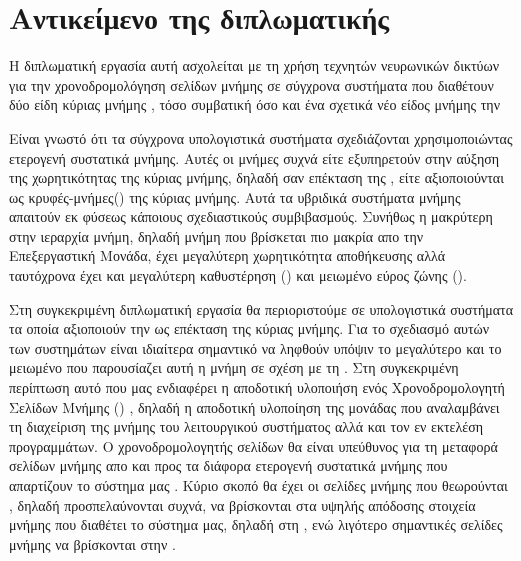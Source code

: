 \begin{comment}
Χρησιμοποιώντας λοιπόν τις τεχνολογίες του Σημασιολογικού Ιστού
μπορούμε να δημιουργήσουμε συστήματα ομότιμων κόμβων με αυξημένη
διαλειτουργικότητα τα οποία θα ανταλλάσσουν μεταξύ τους πληροφορία
με νόημα και θα έχουν τη δυνατότητα διατύπωσης ερωτήσεων πιο
εκφραστικών από αυτές που βασίζονται σε λέξεις κλειδιά.
\end{comment}

\section{Αντικείμενο της διπλωματικής}
Η διπλωματική εργασία αυτή ασχολείται με τη χρήση τεχνητών νευρωνικών δικτύων για την χρονοδρομολόγηση σελίδων μνήμης σε σύγχρονα συστήματα που διαθέτουν δύο είδη κύριας μνήμης , τόσο συμβατική  όσο και ένα σχετικά νέο είδος μνήμης την 

Είναι γνωστό ότι τα σύγχρονα υπολογιστικά συστήματα σχεδιάζονται χρησιμοποιώντας ετερογενή συστατικά μνήμης. Αυτές οι μνήμες συχνά  είτε εξυπηρετούν στην αύξηση της χωρητικότητας της κύριας μνήμης, δηλαδή σαν επέκταση της , είτε αξιοποιούνται ως κρυφές-μνήμες() της κύριας μνήμης. Αυτά τα υβριδικά συστήματα μνήμης απαιτούν εκ φύσεως κάποιους σχεδιαστικούς συμβιβασμούς. Συνήθως η μακρύτερη στην ιεραρχία μνήμη, δηλαδή μνήμη που βρίσκεται πιο μακρία απο την Επεξεργαστική Μονάδα, έχει μεγαλύτερη χωρητικότητα αποθήκευσης αλλά ταυτόχρονα έχει και μεγαλύτερη καθυστέρηση () και μειωμένο εύρος ζώνης ().

Στη συγκεκριμένη διπλωματική εργασία θα περιοριστούμε σε υπολογιστικά συστήματα τα οποία αξιοποιούν την  ως επέκταση της κύριας μνήμης. Για το σχεδιασμό αυτών των συστημάτων είναι ιδιαίτερα σημαντικό να ληφθούν υπόψιν το μεγαλύτερο  και το μειωμένο  που παρουσίαζει αυτή η μνήμη σε σχέση με τη . Στη συγκεκριμένη περίπτωση αυτό που μας ενδιαφέρει η αποδοτική υλοποιήση ενός Χρονοδρομολογητή Σελίδων Μνήμης () , δηλαδή η αποδοτική υλοποίηση της μονάδας που αναλαμβάνει τη διαχείριση της μνήμης του λειτουργικού συστήματος αλλά και τον εν εκτελέση προγραμμάτων. Ο χρονοδρομολογητής σελίδων θα είναι υπεύθυνος για τη μεταφορά σελίδων μνήμης απο και προς τα διάφορα ετερογενή συστατικά μνήμης που απαρτίζουν το σύστημα μας . Κύριο σκοπό θα έχει οι σελίδες μνήμης που θεωρούνται \textit{}, δηλαδή προσπελαύνονται συχνά, να βρίσκονται στα υψηλής απόδοσης στοιχεία μνήμης που διαθέτει το σύστημα μας, δηλαδή στη , ενώ λιγότερο σημαντικές σελίδες μνήμης \textit{} να βρίσκονται στην . 

